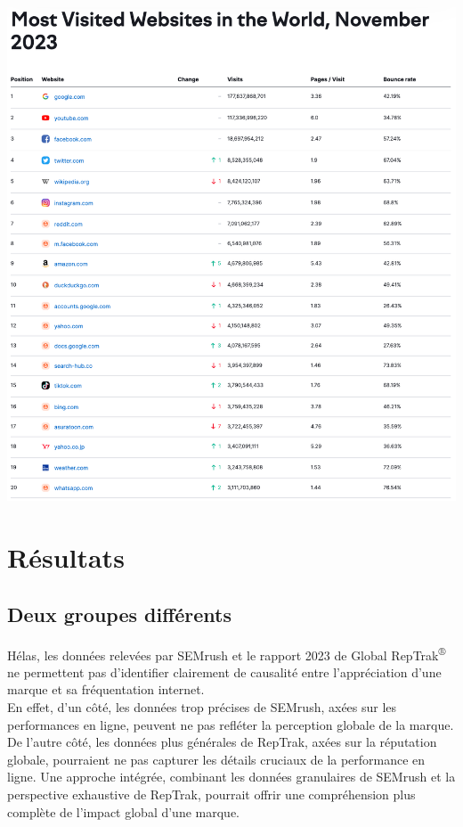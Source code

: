\documentclass[12pt, a4paper]{report}
\begin{document}
\begin{center}
    \includegraphics[scale=.85]{assets/images/semrush-top-20.png}
\end{center}

\chapter{Résultats}

\section{Deux groupes différents}

Hélas, les données relevées par SEMrush et le rapport 2023 de Global RepTrak\textsuperscript{\tiny{®}} ne permettent pas d'identifier clairement de causalité entre l'appréciation d'une marque et sa fréquentation internet.\\

En effet, d'un côté, les données trop précises de SEMrush, axées sur les performances en ligne, peuvent ne pas refléter la perception globale de la marque. De l'autre côté, les données plus générales de RepTrak, axées sur la réputation globale, pourraient ne pas capturer les détails cruciaux de la performance en ligne. Une approche intégrée, combinant les données granulaires de SEMrush et la perspective exhaustive de RepTrak, pourrait offrir une compréhension plus complète de l'impact global d'une marque.\\
\end{document}
